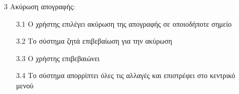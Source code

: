 \documentclass[12pt,a4paper,twoside]{book}
\begin{document}
\begin{enumerate}
  \item[3 ] Ακύρωση απογραφής:
        \begin{enumerate}
          \item [3.1 ] Ο χρήστης επιλέγει ακύρωση της απογραφής σε οποιοδήποτε σημείο %
          \item [3.2 ] Το σύστημα ζητά επιβεβαίωση για την ακύρωση
          \item [3.3 ] Ο χρήστης επιβεβαιώνει
          \item [3.4 ] Το σύστημα απορρίπτει όλες τις αλλαγές και επιστρέφει στο κεντρικό μενού
        \end{enumerate}
\end{enumerate}
\end{document}
